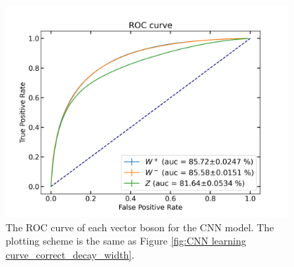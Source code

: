 \documentclass[12pt]{article}
\begin{document}
		\begin{figure}[htpb]
			\centering
			\includegraphics[width=0.95\textwidth]{CNN_roc_auc_correct_width.png}
			\caption{The ROC curve of each vector boson for the CNN model. The plotting scheme is the same as Figure \ref{fig:CNN learning curve_correct_decay_width}.}
			\label{fig:CNN roc curve_correct_decay_width}
		\end{figure}
		
\end{document}

